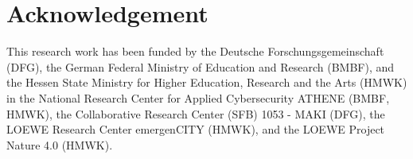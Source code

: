 \documentclass[]{iscram}
\begin{document}
\maketitle










\section*{Acknowledgement}
This research work has been funded by 
the Deutsche Forschungsgemeinschaft (DFG), the German Federal Ministry of Education and Research (BMBF), and
the Hessen State Ministry for Higher Education, Research and the Arts (HMWK) in the
National Research Center for Applied Cybersecurity ATHENE (BMBF, HMWK), the
Collaborative Research Center (SFB) 1053 - MAKI (DFG), the
LOEWE Research Center emergenCITY (HMWK), and
the LOEWE Project Nature 4.0 (HMWK).

\printbibliography
\end{document}
